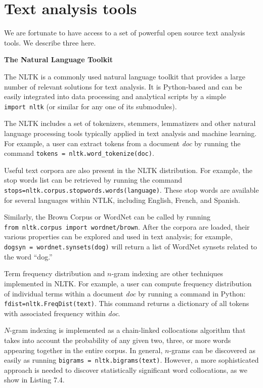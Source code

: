 \documentclass[]{krantz}
\begin{document}
\section{Text analysis tools}\label{text-analysis-tools}

We are fortunate to have access to a set of powerful open source text
analysis tools. We describe three here.

\textbf{The Natural Language Toolkit}

The NLTK is a commonly used natural language toolkit that provides a
large number of relevant solutions for text analysis. It is Python-based
and can be easily integrated into data processing and analytical scripts
by a simple \texttt{import\ nltk} (or similar for any one of its
submodules).

The NLTK includes a set of tokenizers, stemmers, lemmatizers and other
natural language processing tools typically applied in text analysis and
machine learning. For example, a user can extract tokens from a document
\emph{doc} by running the command
\texttt{tokens\ =\ nltk.word\_tokenize(doc)}.

Useful text corpora are also present in the NLTK distribution. For
example, the stop words list can be retrieved by running the command
\texttt{stops=nltk.corpus.stopwords.words(language)}. These stop words
are available for several languages within NTLK, including English,
French, and Spanish.

Similarly, the Brown Corpus or WordNet can be called by running
\texttt{from\ nltk.corpus\ import\ wordnet/brown}. After the corpora are
loaded, their various properties can be explored and used in text
analysis; for example,
\texttt{dogsyn\ =\ wordnet.synsets(\textquotesingle{}dog\textquotesingle{})}
will return a list of WordNet synsets related to the word ``dog.''

Term frequency distribution and \(n\)-gram indexing are other techniques
implemented in NLTK. For example, a user can compute frequency
distribution of individual terms within a document \emph{doc} by running
a command in Python: \texttt{fdist=nltk.FreqDist(text)}. This command
returns a dictionary of all tokens with associated frequency within
\emph{doc}.

\(N\)-gram indexing is implemented as a chain-linked collocations
algorithm that takes into account the probability of any given two,
three, or more words appearing together in the entire corpus. In
general, \(n\)-grams can be discovered as easily as running
\texttt{bigrams\ =\ nltk.bigrams(text)}. However, a more sophisticated
approach is needed to discover statistically significant word
collocations, as we show in Listing 7.4.
\end{document}
